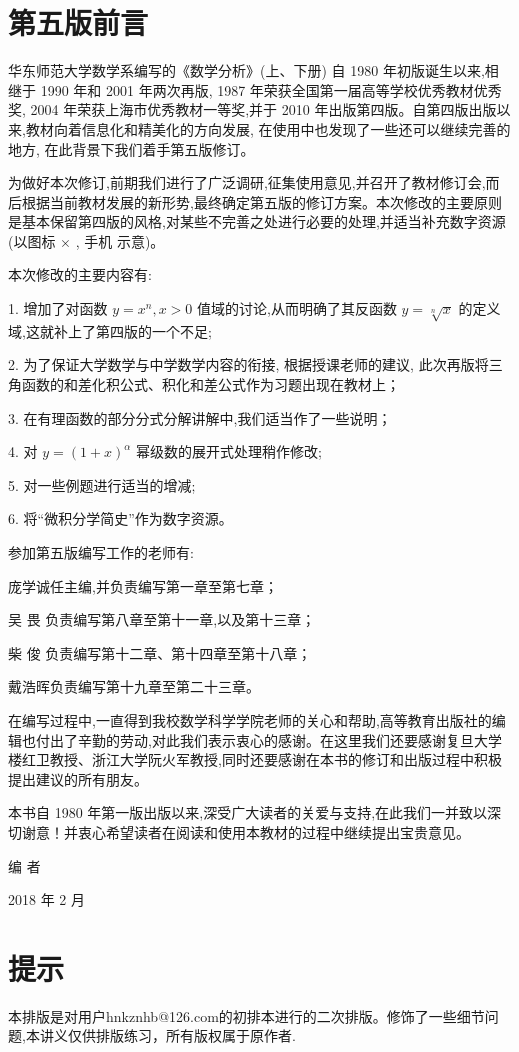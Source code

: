 
\chapter*{第五版前言}


华东师范大学数学系编写的《数学分析》(上、下册) 自 1980 年初版诞生以来,相继于 1990 年和 2001 年两次再版, 1987 年荣获全国第一届高等学校优秀教材优秀奖, 2004 年荣获上海市优秀教材一等奖,并于 2010 年出版第四版。自第四版出版以来,教材向着信息化和精美化的方向发展, 在使用中也发现了一些还可以继续完善的地方, 在此背景下我们着手第五版修订。

为做好本次修订,前期我们进行了广泛调研,征集使用意见,并召开了教材修订会,而后根据当前教材发展的新形势,最终确定第五版的修订方案。本次修改的主要原则是基本保留第四版的风格,对某些不完善之处进行必要的处理,并适当补充数字资源(以图标 \(\times\) , 手机 示意)。

本次修改的主要内容有:

1. 增加了对函数 \(y = {x}^{n},x > 0\) 值域的讨论,从而明确了其反函数 \(y = \sqrt[n]{x}\) 的定义域,这就补上了第四版的一个不足;

2. 为了保证大学数学与中学数学内容的衔接, 根据授课老师的建议, 此次再版将三角函数的和差化积公式、积化和差公式作为习题出现在教材上；

3. 在有理函数的部分分式分解讲解中,我们适当作了一些说明；

4. 对 \(y = {\left( 1 + x\right) }^{\alpha }\) 幂级数的展开式处理稍作修改;

5. 对一些例题进行适当的增减;

6. 将“微积分学简史”作为数字资源。

参加第五版编写工作的老师有:

庞学诚任主编,并负责编写第一章至第七章；

吴 畏 负责编写第八章至第十一章,以及第十三章；

柴 俊 负责编写第十二章、第十四章至第十八章；

戴浩晖负责编写第十九章至第二十三章。

在编写过程中,一直得到我校数学科学学院老师的关心和帮助,高等教育出版社的编辑也付出了辛勤的劳动,对此我们表示衷心的感谢。在这里我们还要感谢复旦大学楼红卫教授、浙江大学阮火军教授,同时还要感谢在本书的修订和出版过程中积极提出建议的所有朋友。

本书自 1980 年第一版出版以来,深受广大读者的关爱与支持,在此我们一并致以深切谢意！并衷心希望读者在阅读和使用本教材的过程中继续提出宝贵意见。

编 者

2018 年 2 月

\newpage

\chapter*{提示}

本排版是对用户hnkznhb@126.com的初排本进行的二次排版。修饰了一些细节问题,本讲义仅供排版练习，所有版权属于原作者.
